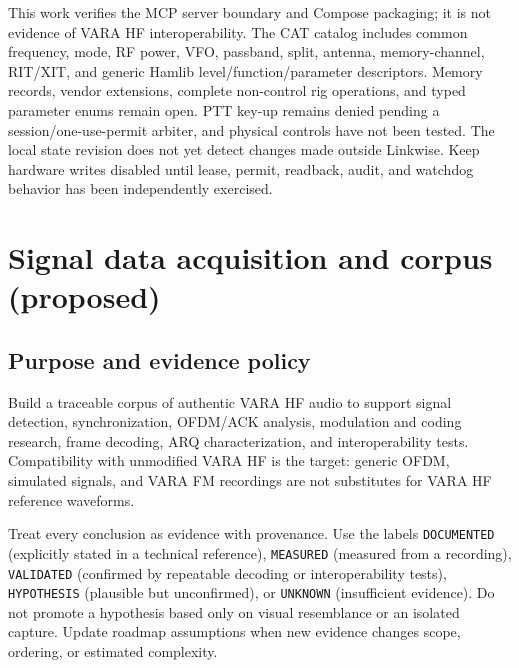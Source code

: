 \documentclass[11pt,a4paper]{article}
\begin{document}
This work verifies the MCP server boundary and Compose packaging; it is not
evidence of VARA HF interoperability. The CAT catalog includes common
frequency, mode, RF power, VFO, passband, split, antenna, memory-channel,
RIT/XIT, and generic Hamlib level/function/parameter descriptors. Memory
records, vendor extensions, complete non-control rig operations, and typed
parameter enums remain open. PTT key-up remains
denied pending a session/one-use-permit arbiter, and physical controls have not
been tested. The local state revision does not yet detect changes made outside
Linkwise. Keep hardware writes disabled until lease, permit, readback, audit,
and watchdog behavior has been independently exercised.

\section{Signal data acquisition and corpus (proposed)}

\subsection{Purpose and evidence policy}
Build a traceable corpus of authentic VARA HF audio to support signal detection,
synchronization, OFDM/ACK analysis, modulation and coding research, frame
decoding, ARQ characterization, and interoperability tests. Compatibility with
unmodified VARA HF is the target: generic OFDM, simulated signals, and VARA FM
recordings are not substitutes for VARA HF reference waveforms.

Treat every conclusion as evidence with provenance. Use the labels
\texttt{DOCUMENTED} (explicitly stated in a technical reference),
\texttt{MEASURED} (measured from a recording), \texttt{VALIDATED} (confirmed
by repeatable decoding or interoperability tests), \texttt{HYPOTHESIS}
(plausible but unconfirmed), or \texttt{UNKNOWN} (insufficient evidence).
Do not promote a hypothesis based only on visual resemblance or an isolated
capture. Update roadmap assumptions when new evidence changes scope, ordering,
or estimated complexity.
\end{document}

